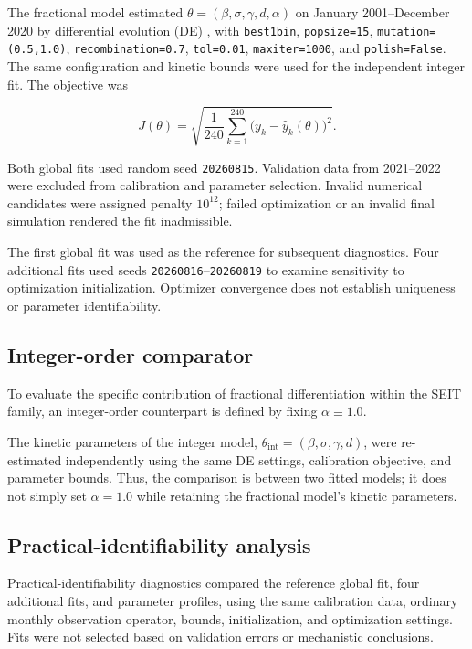 \documentclass[pdflatex,sn-mathphys-ay,lineno]{sn-jnl}
\begin{document}
The fractional model estimated $\theta=(\beta,\sigma,\gamma,d,\alpha)$ on January 2001--December 2020 by differential evolution (DE) \citep{storn1997}, with \texttt{best1bin}, \texttt{popsize=15}, \texttt{mutation=(0.5,1.0)}, \texttt{recombination=0.7}, \texttt{tol=0.01}, \texttt{maxiter=1000}, and \texttt{polish=False}. The same configuration and kinetic bounds were used for the independent integer fit. The objective was

\[
J(\theta)=\sqrt{\frac{1}{240}\sum_{k=1}^{240}\bigl(y_k-\widehat y_k(\theta)\bigr)^2}.
\]

Both global fits used random seed \texttt{20260815}. Validation data from 2021--2022 were excluded from calibration and parameter selection. Invalid numerical candidates were assigned penalty $10^{12}$; failed optimization or an invalid final simulation rendered the fit inadmissible.

The first global fit was used as the reference for subsequent diagnostics. Four additional fits used seeds \texttt{20260816}--\texttt{20260819} to examine sensitivity to optimization initialization. Optimizer convergence does not establish uniqueness or parameter identifiability.

\subsection{Integer-order comparator}

To evaluate the specific contribution of fractional differentiation within the SEIT family, an integer-order counterpart is defined by fixing $\alpha \equiv 1.0$.

The kinetic parameters of the integer model, $\theta_{\text{int}}=(\beta,\sigma,\gamma,d)$, were re-estimated independently using the same DE settings, calibration objective, and parameter bounds. Thus, the comparison is between two fitted models; it does not simply set $\alpha=1.0$ while retaining the fractional model's kinetic parameters.

\subsection{Practical-identifiability analysis}

Practical-identifiability diagnostics compared the reference global fit, four additional fits, and parameter profiles, using the same calibration data, ordinary monthly observation operator, bounds, initialization, and optimization settings. Fits were not selected based on validation errors or mechanistic conclusions.
\end{document}
